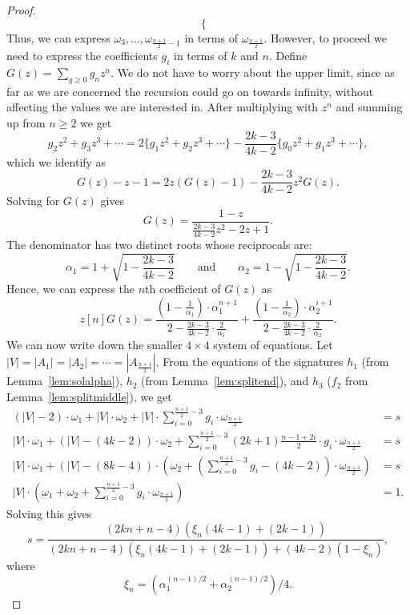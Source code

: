 \documentclass[11pt,a4paper]{article}
\begin{document}
\begin{proof}
\[\begin{cases}
\end{cases} 
\]
Thus, we can express $\omega_3,\ldots,\omega_{\frac{n+1}{2}-1}$ in terms of $\omega_{\frac{n+1}{2}}$. However, to proceed we need to express the coefficients $g_i$ in terms of $k$ and $n$. Define $G(z) = \sum_{g\geq0}{g_n z^n}$. We do not have to worry about the upper limit, since as far as we are concerned the recursion could go on towards infinity, without affecting the values we are interested in. After multiplying with $z^n$ and summing up from $n \geq 2$ we get
\[
g_2z^2+g_3z^3+\cdots = 2\{g_1z^2+g_2z^3+\cdots\}-\frac{2k-3}{4k-2}\{g_0z^2+g_1z^3+\cdots\},
\]
which we identify as
\[
G(z)-z-1=2z(G(z)-1)-\frac{2k-3}{4k-2}z^2G(z).
\]
Solving for $G(z)$ gives
\[
G(z) = \frac{1-z}{\frac{2k-3}{4k-2}z^2-2z+1}.
\]
The denominator has two distinct roots whose reciprocals are:
\[
\alpha_1=1+\sqrt{1-\frac{2k-3}{4k-2}} \qquad \text{and} \qquad \alpha_2=1-\sqrt{1-\frac{2k-3}{4k-2}}.
\]
Hence, we can express the $n$th coefficient of $G(z)$ as
\[
z[n]G(z)=\frac{(1-\frac{1}{\alpha_1})\cdot \alpha_1^{n+1}}{2-\frac{2k-3}{4k-2}\cdot\frac{2}{\alpha_1}}+\frac{(1-\frac{1}{\alpha_2})\cdot \alpha_2^{i+1}}{2-\frac{2k-3}{4k-2}\cdot\frac{2}{\alpha_2}}.
\]
We can now write down the smaller $4 \times 4$ system of equations. Let $|V| = |A_1| = |A_2| = \cdots = |A_{\frac{n+1}{2}}|$. From the equations of the signatures $h_1$ (from Lemma~\ref{lem:solalpha}), $h_2$ (from Lemma~\ref{lem:splitend}), and $h_3$ ($f_2$ from Lemma~\ref{lem:splitmiddle}), we get
\[
\begin{array}{ll}
 (|V|-2) \cdot \omega_1  +  |V| \cdot \omega_2  +  |V| \cdot \displaystyle \sum_{i=0}^{\frac{n+1}{2}-3}g_i\cdot\omega_{\frac{n+1}{2}}  & =  s \\
 |V| \cdot \omega_1  +  (|V|-(4k-2)) \cdot \omega_2  +  \displaystyle \sum_{i=0}^{\frac{n+1}{2}-3}(2k+1)\frac{n-1+2i}{2}\cdot g_i\cdot\omega_{\frac{n+1}{2}} & =  s \\ 
 |V| \cdot \omega_1  +  (|V|-(8k-4)) \cdot (\omega_2 + \left(\displaystyle \sum_{i=0}^{\frac{n+1}{2}-3}g_i - (4k-2)\right) \cdot \omega_{\frac{n+1}{2}})  & =  s \\
 |V|\cdot(\omega_1+\omega_2 + \displaystyle \sum_{i=0}^{\frac{n+1}{2}-3}g_i\cdot\omega_{\frac{n+1}{2}}) & = 1.
\end{array}
\]
Solving this gives
\[
s=\frac{(2kn+n-4)(\xi_n(4k-1)+(2k-1))}{(2kn+n-4)(\xi_n(4k-1)+(2k-1))+(4k-2)(1-\xi_n)},
\]
where
\[
\xi_n = 
\left(\alpha_1^{(n-1)/2} + \alpha_2^{(n-1)/2}\right)/4.
\]
\end{proof}
\end{document}
